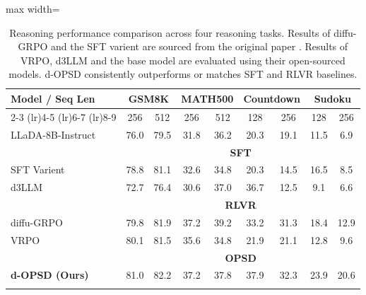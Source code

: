 \documentclass{llmxive}
\begin{document}
\begin{table}[!t]
\centering
\begin{threeparttable}
\begin{adjustbox}{max width=\textwidth}
\begin{tabular}{lcccccccc}
\toprule
\multirow{2}{*}{Model / Seq Len} & \multicolumn{2}{c}{GSM8K} & \multicolumn{2}{c}{MATH500} & \multicolumn{2}{c}{Countdown} & \multicolumn{2}{c}{Sudoku} \\
\cmidrule(lr){2-3} \cmidrule(lr){4-5} \cmidrule(lr){6-7} \cmidrule(lr){8-9}
 & 256 & 512 & 256 & 512 & 128 & 256 & 128 & 256 \\
\midrule

LLaDA-8B-Instruct & 76.0 & 79.5 & 31.8 & 36.2 & 20.3 & 19.1 & 11.5 & 6.9 \\
\midrule
& \multicolumn{8}{c}{\textbf{SFT}} \\
SFT Varient \citep{zhao2025d1} & 78.8 & 81.1 & 32.6 & 34.8 & 20.3 & 14.5 & 16.5 & 8.5 \\
d3LLM \citep{qian2026d3llm} & 72.7 & 76.4 & 30.6 & 37.0 & 36.7 & 12.5 & 9.1 & 6.6 \\
\midrule
& \multicolumn{8}{c}{\textbf{RLVR}} \\
diffu-GRPO \citep{zhao2025d1} & 79.8 & 81.9 & 37.2 & \cellcolor{lightblue} 39.2 & 33.2 & 31.3 & 18.4 & 12.9 \\
VRPO \citep{zhu2025llada} & 80.1 & 81.5 & 35.6 & 34.8 & 21.9 & 21.1 & 12.8 & 9.6 \\
\midrule
& \multicolumn{8}{c}{\textbf{OPSD}} \\
\textbf{d-OPSD (Ours)} & \cellcolor{lightblue} 81.0 & \cellcolor{lightblue} 82.2 & \cellcolor{lightblue} 37.2 & 37.8 & \cellcolor{lightblue} 37.9 & \cellcolor{lightblue} 32.3 & \cellcolor{lightblue} 23.9 & \cellcolor{lightblue} 20.6 \\

\bottomrule
\label{tab2}
\end{tabular}
\end{adjustbox}
\end{threeparttable}
\vspace{-20pt}
\caption{Reasoning performance comparison across four reasoning tasks. Results of diffu-GRPO and the SFT varient are sourced from the original paper \citep{zhao2025d1}. Results of VRPO, d3LLM and the base model are evaluated using their open-sourced models. d-OPSD consistently outperforms or matches SFT and RLVR baselines.}
\end{table}
\end{document}

